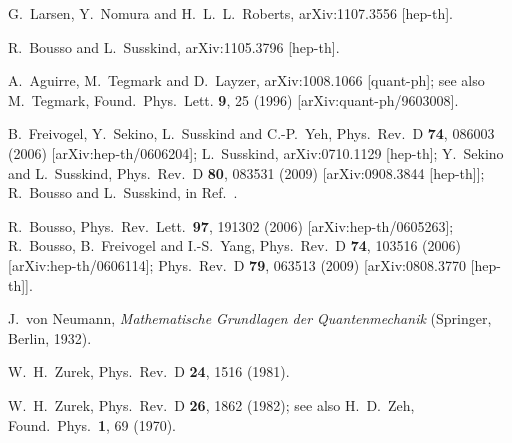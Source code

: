 \documentclass[12pt]{article}
\begin{document}
\begin{thebibliography}{99}
G.~Larsen, Y.~Nomura and H.~L.~L.~Roberts,
arXiv:1107.3556 [hep-th].

R.~Bousso and L.~Susskind,
arXiv:1105.3796 [hep-th].

A.~Aguirre, M.~Tegmark and D.~Layzer,
arXiv:1008.1066 [quant-ph];
see also
M.~Tegmark,
Found.\ Phys.\  Lett. {\bf 9}, 25 (1996)
[arXiv:quant-ph/9603008].

B.~Freivogel, Y.~Sekino, L.~Susskind and C.-P.~Yeh,
Phys.\ Rev.\  D {\bf 74}, 086003 (2006)
[arXiv:hep-th/0606204];
L.~Susskind,
arXiv:0710.1129 [hep-th];
Y.~Sekino and L.~Susskind,
Phys.\ Rev.\  D {\bf 80}, 083531 (2009)
[arXiv:0908.3844 [hep-th]];
R.~Bousso and L.~Susskind,
in Ref.~\cite{Bousso:2011up}.

R.~Bousso,
Phys.\ Rev.\ Lett.\ {\bf 97}, 191302 (2006)
[arXiv:hep-th/0605263];
R.~Bousso, B.~Freivogel and I.-S.~Yang,
Phys.\ Rev.\  D {\bf 74}, 103516 (2006)
[arXiv:hep-th/0606114];
Phys.\ Rev.\  D {\bf 79}, 063513 (2009)
[arXiv:0808.3770 [hep-th]].

J.~von Neumann,
{\it Mathematische Grundlagen der Quantenmechanik}
(Springer, Berlin, 1932).

W.~H.~Zurek,
Phys.\ Rev.\  D {\bf 24}, 1516 (1981).

W.~H.~Zurek,
Phys.\ Rev.\  D {\bf 26}, 1862 (1982);
see also
H.~D.~Zeh,
Found.\ Phys.\  {\bf 1}, 69 (1970).


\end{thebibliography}
\end{document}
